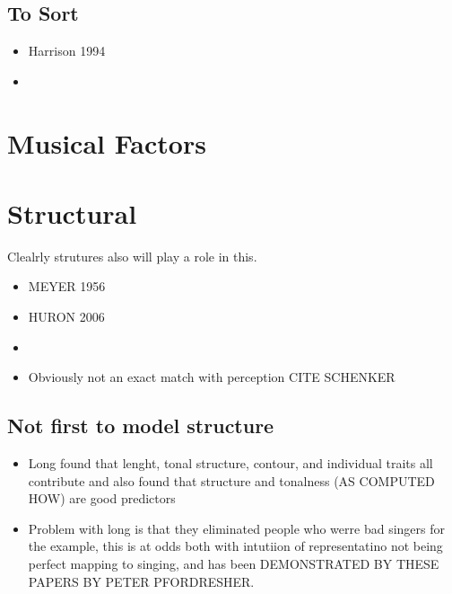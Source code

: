 \documentclass[]{book}
\providecommand{\tightlist}{%
  \setlength{\itemsep}{0pt}\setlength{\parskip}{0pt}}
\theoremstyle{definition}
\theoremstyle{definition}
\theoremstyle{definition}
\theoremstyle{remark}
\begin{document}
\hypertarget{to-sort}{%
\subsection{To Sort}\label{to-sort}}

\begin{itemize}
\item
  Harrison 1994
\item
\end{itemize}

\hypertarget{musical-factors}{%
\section{Musical Factors}\label{musical-factors}}

\hypertarget{structural}{%
\section{Structural}\label{structural}}

Clealrly strutures also will play a role in this.

\begin{itemize}
\item
  MEYER 1956
\item
  HURON 2006
\item
  \citep{margulisModelMelodicExpectation2005}
\item
  Obviously not an exact match with perception CITE SCHENKER
\end{itemize}

\hypertarget{not-first-to-model-structure}{%
\subsection{Not first to model
structure}\label{not-first-to-model-structure}}

\begin{itemize}
\tightlist
\item
  Long found that lenght, tonal structure, contour, and individual
  traits all contribute and also found that structure and tonalness (AS
  COMPUTED HOW) are good predictors
  \citep{longRelationshipsPitchMemory1977}
\item
  Problem with long is that they eliminated people who werre bad singers
  for the example, this is at odds both with intutiion of representatino
  not being perfect mapping to singing, and has been DEMONSTRATED BY
  THESE PAPERS BY PETER PFORDRESHER.
\end{itemize}
\end{document}
